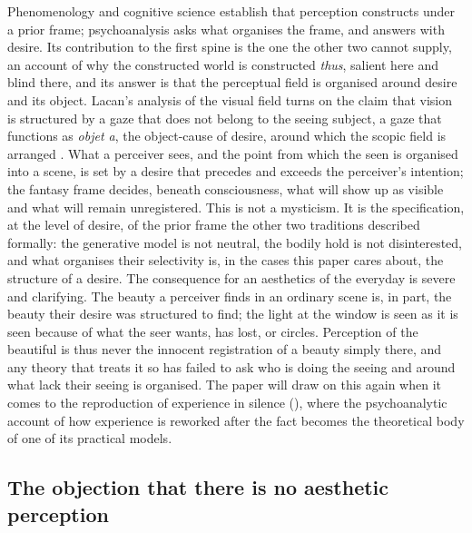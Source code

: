 Phenomenology and cognitive science establish that perception constructs under a prior frame; psychoanalysis asks what organises the frame, and answers with desire. Its contribution to the first spine is the one the other two cannot supply, an account of why the constructed world is constructed \emph{thus}, salient here and blind there, and its answer is that the perceptual field is organised around desire and its object. Lacan's analysis of the visual field turns on the claim that vision is structured by a gaze that does not belong to the seeing subject, a gaze that functions as \emph{objet a}, the object-cause of desire, around which the scopic field is arranged \parencite{lacan1978}. What a perceiver sees, and the point from which the seen is organised into a scene, is set by a desire that precedes and exceeds the perceiver's intention; the fantasy frame decides, beneath consciousness, what will show up as visible and what will remain unregistered. This is not a mysticism. It is the specification, at the level of desire, of the prior frame the other two traditions described formally: the generative model is not neutral, the bodily hold is not disinterested, and what organises their selectivity is, in the cases this paper cares about, the structure of a desire. The consequence for an aesthetics of the everyday is severe and clarifying. The beauty a perceiver finds in an ordinary scene is, in part, the beauty their desire was structured to find; the light at the window is seen as it is seen because of what the seer wants, has lost, or circles. Perception of the beautiful is thus never the innocent registration of a beauty simply there, and any theory that treats it so has failed to ask who is doing the seeing and around what lack their seeing is organised. The paper will draw on this again when it comes to the reproduction of experience in silence (), where the psychoanalytic account of how experience is reworked after the fact becomes the theoretical body of one of its practical models.

\subsection{The objection that there is no aesthetic perception}
\label{p23:sub:gen-dickie}

